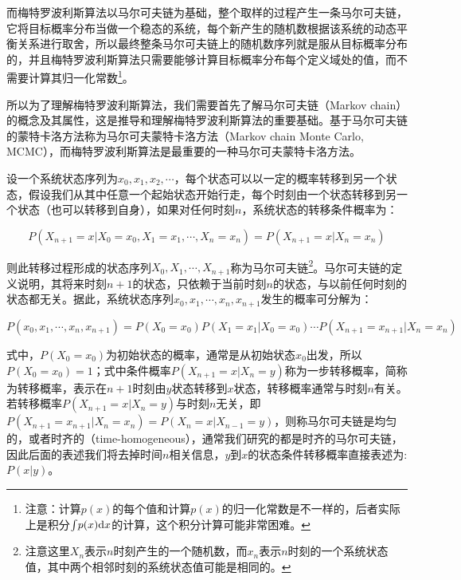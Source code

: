 而梅特罗波利斯算法以马尔可夫链为基础，整个取样的过程产生一条马尔可夫链，它将目标概率分布当做一个稳态的系统，每个新产生的随机数根据该系统的动态平衡关系进行取舍，所以最终整条马尔可夫链上的随机数序列就是服从目标概率分布的，并且梅特罗波利斯算法只需要能够计算目标概率分布每个定义域处的值，而不需要计算其归一化常数\footnote{注意：计算$p(x)$的每个值和计算$p(x)$的归一化常数是不一样的，后者实际上是积分${\rm \int} p(x){\rm d}x$的计算，这个积分计算可能非常困难。}。

所以为了理解梅特罗波利斯算法，我们需要首先了解马尔可夫链（Markov chain）的概念及其属性，这是推导和理解梅特罗波利斯算法的重要基础。基于马尔可夫链的蒙特卡洛方法称为马尔可夫蒙特卡洛方法（Markov chain Monte Carlo, MCMC），而梅特罗波利斯算法是最重要的一种马尔可夫蒙特卡洛方法。

设一个系统状态序列为$x_0,x_1,x_2,\cdots$，每个状态可以以一定的概率转移到另一个状态，假设我们从其中任意一个起始状态开始行走，每个时刻由一个状态转移到另一个状态（也可以转移到自身），如果对任何时刻$n$，系统状态的转移条件概率为：

\begin{equation}
	P(X_{n+1}=x|X_0=x_0,X_1=x_1,\cdots,X_n=x_n)=P(X_{n+1}=x|X_n=x_n)
\end{equation}

\noindent 则此转移过程形成的状态序列$X_0,X_1,\cdots,X_{n+1}$称为马尔可夫链\footnote{注意这里$X_n$表示$n$时刻产生的一个随机数，而$x_n$表示$n$时刻的一个系统状态值，其中两个相邻时刻的系统状态值可能是相同的。}。马尔可夫链的定义说明，其将来时刻$n+1$的状态，只依赖于当前时刻$n$的状态，与以前任何时刻的状态都无关。据此，系统状态序列$x_0,x_1,\cdots,x_n,x_{n+1}$发生的概率可分解为：

\begin{equation}
	P(x_0,x_1,\cdots,x_n,x_{n+1})=P(X_0=x_0)P(X_1=x_1|X_0=x_0)\cdots P(X_{n+1}=x_{n+1}|X_n=x_n)
\end{equation}

\noindent 式中，$P(X_0=x_0)$为初始状态的概率，通常是从初始状态$x_0$出发，所以$P(X_0=x_0)=1$；式中条件概率$P(X_{n+1}=x|X_n=y)$称为一步转移概率，简称为转移概率，表示在$n+1$时刻由$y$状态转移到$x$状态，转移概率通常与时刻$n$有关。若转移概率$P(X_{n+1}=x|X_n=y)$与时刻$n$无关，即$P(X_{n+1}=x_{n+1}|X_n=x_n)=P(X_n=x|X_{n-1}=y)$，则称马尔可夫链是均匀的，或者时齐的（time-homogeneous），通常我们研究的都是时齐的马尔可夫链，因此后面的表述我们将去掉时间$n$相关信息，$y$到$x$的状态条件转移概率直接表述为: $P(x|y)$。

